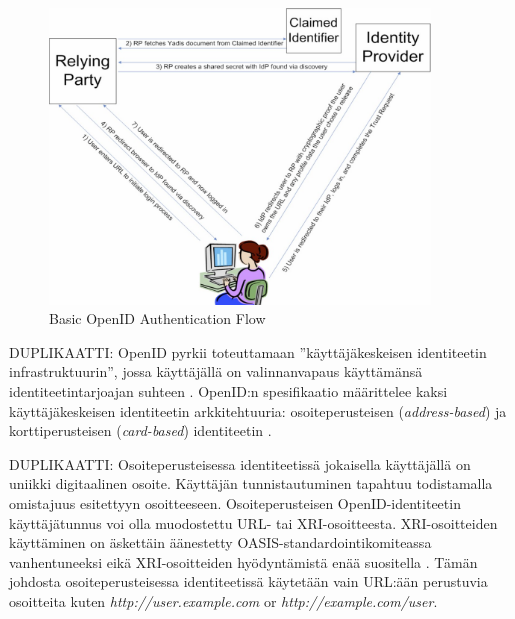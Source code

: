 \documentclass[english,gradu]{tktltiki}
\begin{document}
     \begin{figure}
       \centering
       \includegraphics[width=0.9\textwidth]{images/openid_flow_recordon06.jpg}
       \caption{Basic OpenID Authentication Flow \cite{openid_2.0_platform_2009}}
       \label{fig:basic_openid_flow}
     \end{figure}


              DUPLIKAATTI:
OpenID pyrkii toteuttamaan ''käyttäjäkeskeisen identiteetin infrastruktuurin'', jossa käyttäjällä on valinnanvapaus käyttämänsä identiteetintarjoajan suhteen \cite{openid_2.0_platform_2009}. OpenID:n spesifikaatio määrittelee kaksi käyttäjäkeskeisen identiteetin arkkitehtuuria: osoiteperusteisen (\emph{address-based}) ja korttiperusteisen (\emph{card-based}) identiteetin \cite{openid_2.0_specification_07}.

              DUPLIKAATTI:
Osoiteperusteisessa identiteetissä jokaisella käyttäjällä on uniikki digitaalinen osoite. Käyttäjän tunnistautuminen tapahtuu todistamalla omistajuus esitettyyn osoitteeseen. Osoiteperusteisen OpenID-identiteetin käyttäjätunnus voi olla muodostettu URL- tai XRI-osoitteesta. XRI-osoitteiden käyttäminen on äskettäin äänestetty OASIS-standardointikomiteassa vanhentuneeksi eikä XRI-osoitteiden hyödyntämistä enää suositella \cite{xri_depcrecated_08a, xri_depcrecated_08b, xri_depcrecated_08c, xri_depcrecated_08d}. Tämän johdosta osoiteperusteisessa identiteetissä käytetään vain URL:ään perustuvia osoitteita kuten \emph{http://user.example.com} or \emph{http://example.com/user}.
\end{document}
